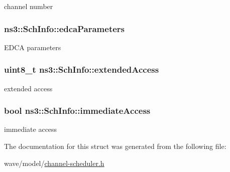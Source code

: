 channel number 

\subsubsection[{\texorpdfstring{edca\+Parameters}{edcaParameters}}]{ ns3\+::\+Sch\+Info\+::edca\+Parameters}\hypertarget{structns3_1_1SchInfo_a79df358208767350348f61063e4c3303}{}\label{structns3_1_1SchInfo_a79df358208767350348f61063e4c3303}
E\+D\+CA parameters 
\subsubsection[{\texorpdfstring{extended\+Access}{extendedAccess}}]{\setlength{\rightskip}{0pt plus 5cm}uint8\+\_\+t ns3\+::\+Sch\+Info\+::extended\+Access}\hypertarget{structns3_1_1SchInfo_a4c819d5734d4a62f58fce9a701e6288a}{}\label{structns3_1_1SchInfo_a4c819d5734d4a62f58fce9a701e6288a}


extended access 

\subsubsection[{\texorpdfstring{immediate\+Access}{immediateAccess}}]{\setlength{\rightskip}{0pt plus 5cm}bool ns3\+::\+Sch\+Info\+::immediate\+Access}\hypertarget{structns3_1_1SchInfo_ab81e6423eb00fabcd0e9bad1e9501f31}{}\label{structns3_1_1SchInfo_ab81e6423eb00fabcd0e9bad1e9501f31}


immediate access 



The documentation for this struct was generated from the following file\+:\begin{DoxyCompactItemize}
\item 
wave/model/\hyperlink{channel-scheduler_8h}{channel-\/scheduler.\+h}\end{DoxyCompactItemize}
